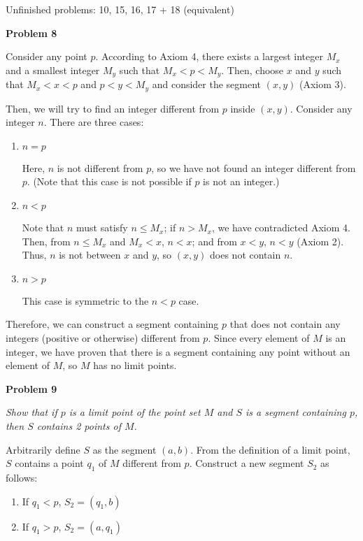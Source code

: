 \documentclass{article}
\begin{document}
Unfinished problems: 10, 15, 16, 17 + 18 (equivalent)

\textbf{Problem 8}

Consider any point $p$. According to Axiom 4, there exists a largest integer $M_x$ and a smallest integer $M_y$ such that $M_x < p < M_y$. Then, choose $x$ and $y$ such that $M_x < x < p$ and $p < y < M_y$ and consider the segment $(x, y)$ (Axiom 3).

Then, we will try to find an integer different from $p$ inside $(x, y)$. Consider any integer $n$. There are three cases:

\begin{enumerate}
\item $n = p$

Here, $n$ is not different from $p$, so we have not found an integer different from $p$. (Note that this case is not possible if $p$ is not an integer.)

\item $n < p$

Note that $n$ must satisfy $n \leq M_x$; if $n > M_x$, we have contradicted Axiom 4. Then, from $n \leq M_x$ and $M_x < x$, $n < x$; and from $x < y$, $n < y$ (Axiom 2). Thus, $n$ is not between $x$ and $y$, so $(x, y)$ does not contain $n$.

\item $n > p$

This case is symmetric to the $n < p$ case.
\end{enumerate}

Therefore, we can construct a segment containing $p$ that does not contain any integers (positive or otherwise) different from $p$. Since every element of $M$ is an integer, we have proven that there is a segment containing any point without an element of $M$, so $M$ has no limit points.
\vspace{10pt}


\textbf{Problem 9}

\textit{Show that if $p$ is a limit point of the point set $M$ and $S$ is a segment containing $p$, then $S$ contains 2 points of $M$.}

Arbitrarily define $S$ as the segment $(a, b)$. From the definition of a limit point, $S$ contains a point $q_1$ of $M$ different from $p$. Construct a new segment $S_2$ as follows:

\begin{enumerate}
\item
If $q_1 < p$, $S_2 = (q_1, b)$

\item
If $q_1 > p$, $S_2 = (a, q_1)$
\end{enumerate}
\end{document}
